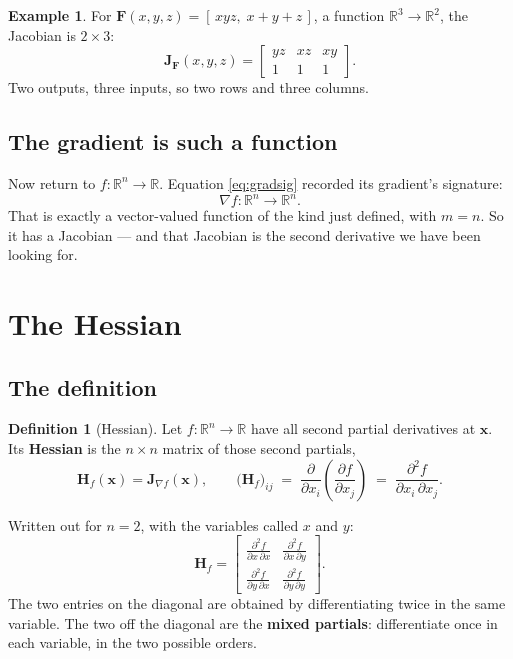 \documentclass[11pt]{article}
\theoremstyle{plain}
\theoremstyle{definition}
\newtheorem{defn}{Definition}[section]
\newtheorem{ex}{Example}[section]
\theoremstyle{remark}
\newcommand{\R}{\mathbb{R}}
\newcommand{\vc}[1]{\mathbf{#1}}
\newcommand{\grad}{\nabla}
\newcommand{\pd}[2]{\frac{\partial #1}{\partial #2}}
\newcommand{\mt}[1]{\mathbf{#1}}          %
\newcommand{\pdd}[3]{\frac{\partial^{2} #1}{\partial #2\,\partial #3}}
\begin{document}
\begin{ex}
For $\mt{F}(x,y,z)=[\,xyz,\;x+y+z\,]$, a function $\R^{3}\to\R^{2}$, the
Jacobian is $2\times3$:
\[
  \mt{J}_{\mt{F}}(x,y,z)=
  \begin{bmatrix}
    yz & xz & xy\\
    1  & 1  & 1
  \end{bmatrix} .
\]
Two outputs, three inputs, so two rows and three columns.
\end{ex}

\subsection{The gradient is such a function}
Now return to $f:\R^{n}\to\R$. Equation \eqref{eq:gradsig} recorded its gradient's signature:
\[
  \grad f : \R^{n}\longrightarrow\R^{n} .
\]
That is exactly a vector-valued function of the kind just defined, with $m=n$.
So it has a Jacobian --- and that Jacobian is the second derivative we have been
looking for.

\section{The Hessian}

\subsection{The definition}
\begin{defn}[Hessian]
Let $f:\R^{n}\to\R$ have all second partial derivatives at $\vc{x}$. Its
\textbf{Hessian} is the $n\times n$ matrix of those second partials,
\[
  \mt{H}_{f}(\vc{x}) = \mt{J}_{\grad f}(\vc{x}),
  \qquad
  \bigl(\mt{H}_{f}\bigr)_{ij}
  \;=\; \pd{}{x_i}\!\left(\pd{f}{x_j}\right)
  \;=\; \pdd{f}{x_i}{x_j} .
\]
\end{defn}

\noindent Written out for $n=2$, with the variables called $x$ and $y$:
\[
  \mt{H}_{f}
  =
  \begin{bmatrix}
    \pdd{f}{x}{x} & \pdd{f}{x}{y}\\[8pt]
    \pdd{f}{y}{x} & \pdd{f}{y}{y}
  \end{bmatrix} .
\]
The two entries on the diagonal are obtained by differentiating twice in the
same variable. The two off the diagonal are the \textbf{mixed partials}:
differentiate once in each variable, in the two possible orders.
\end{document}
